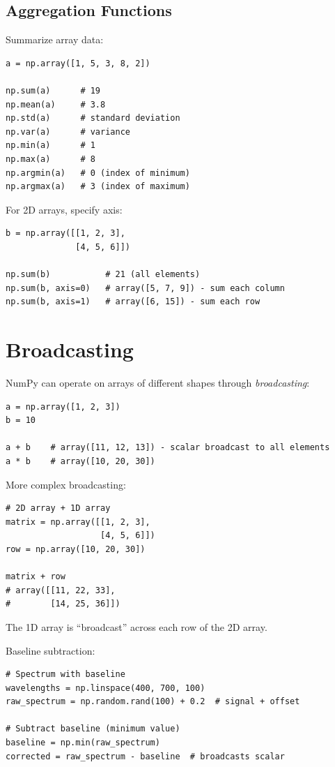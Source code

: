 \subsection{Aggregation Functions}

Summarize array data:

\begin{lstlisting}
a = np.array([1, 5, 3, 8, 2])

np.sum(a)      # 19
np.mean(a)     # 3.8
np.std(a)      # standard deviation
np.var(a)      # variance
np.min(a)      # 1
np.max(a)      # 8
np.argmin(a)   # 0 (index of minimum)
np.argmax(a)   # 3 (index of maximum)
\end{lstlisting}

For 2D arrays, specify axis:

\begin{lstlisting}
b = np.array([[1, 2, 3],
              [4, 5, 6]])

np.sum(b)           # 21 (all elements)
np.sum(b, axis=0)   # array([5, 7, 9]) - sum each column
np.sum(b, axis=1)   # array([6, 15]) - sum each row
\end{lstlisting}

\section{Broadcasting}
\label{sec:broadcasting}

NumPy can operate on arrays of different shapes through \emph{broadcasting}:

\begin{lstlisting}
a = np.array([1, 2, 3])
b = 10

a + b    # array([11, 12, 13]) - scalar broadcast to all elements
a * b    # array([10, 20, 30])
\end{lstlisting}

More complex broadcasting:

\begin{lstlisting}
# 2D array + 1D array
matrix = np.array([[1, 2, 3],
                   [4, 5, 6]])
row = np.array([10, 20, 30])

matrix + row
# array([[11, 22, 33],
#        [14, 25, 36]])
\end{lstlisting}

The 1D array is ``broadcast'' across each row of the 2D array.

\begin{labexample}
Baseline subtraction:

\begin{lstlisting}
# Spectrum with baseline
wavelengths = np.linspace(400, 700, 100)
raw_spectrum = np.random.rand(100) + 0.2  # signal + offset

# Subtract baseline (minimum value)
baseline = np.min(raw_spectrum)
corrected = raw_spectrum - baseline  # broadcasts scalar
\end{lstlisting}
\end{labexample}

